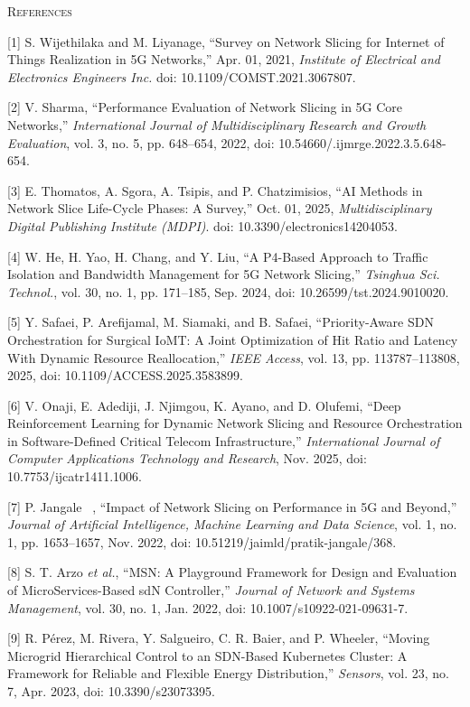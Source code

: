 \textsc{References}

{[}1{]} S. Wijethilaka and M. Liyanage, ``Survey on Network Slicing for Internet of Things Realization in 5G Networks,'' Apr. 01, 2021, \emph{Institute of Electrical and Electronics Engineers Inc.} doi: 10.1109/COMST.2021.3067807.

{[}2{]} V. Sharma, ``Performance Evaluation of Network Slicing in 5G Core Networks,'' \emph{International Journal of Multidisciplinary Research and Growth Evaluation}, vol. 3, no. 5, pp. 648--654, 2022, doi: 10.54660/.ijmrge.2022.3.5.648-654.

{[}3{]} E. Thomatos, A. Sgora, A. Tsipis, and P. Chatzimisios, ``AI Methods in Network Slice Life-Cycle Phases: A Survey,'' Oct. 01, 2025, \emph{Multidisciplinary Digital Publishing Institute (MDPI)}. doi: 10.3390/electronics14204053.

{[}4{]} W. He, H. Yao, H. Chang, and Y. Liu, ``A P4-Based Approach to Traffic Isolation and Bandwidth Management for 5G Network Slicing,'' \emph{Tsinghua Sci. Technol.}, vol. 30, no. 1, pp. 171--185, Sep. 2024, doi: 10.26599/tst.2024.9010020.

{[}5{]} Y. Safaei, P. Arefijamal, M. Siamaki, and B. Safaei, ``Priority-Aware SDN Orchestration for Surgical IoMT: A Joint Optimization of Hit Ratio and Latency With Dynamic Resource Reallocation,'' \emph{IEEE Access}, vol. 13, pp. 113787--113808, 2025, doi: 10.1109/ACCESS.2025.3583899.

{[}6{]} V. Onaji, E. Adediji, J. Njimgou, K. Ayano, and D. Olufemi, ``Deep Reinforcement Learning for Dynamic Network Slicing and Resource Orchestration in Software-Defined Critical Telecom Infrastructure,'' \emph{International Journal of Computer Applications Technology and Research}, Nov. 2025, doi: 10.7753/ijcatr1411.1006.

{[}7{]} P. Jangale~ , ``Impact of Network Slicing on Performance in 5G and Beyond,'' \emph{Journal of Artificial Intelligence, Machine Learning and Data Science}, vol. 1, no. 1, pp. 1653--1657, Nov. 2022, doi: 10.51219/jaimld/pratik-jangale/368.

{[}8{]} S. T. Arzo \emph{et al.}, ``MSN: A Playground Framework for Design and Evaluation of MicroServices-Based sdN Controller,'' \emph{Journal of Network and Systems Management}, vol. 30, no. 1, Jan. 2022, doi: 10.1007/s10922-021-09631-7.

{[}9{]} R. Pérez, M. Rivera, Y. Salgueiro, C. R. Baier, and P. Wheeler, ``Moving Microgrid Hierarchical Control to an SDN-Based Kubernetes Cluster: A Framework for Reliable and Flexible Energy Distribution,'' \emph{Sensors}, vol. 23, no. 7, Apr. 2023, doi: 10.3390/s23073395.


